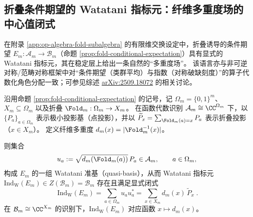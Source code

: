 \subsection{折叠条件期望的 Watatani 指标元：纤维多重度场的中心值闭式}\label{subsec:op-algebra-fold-watatani-index}
在附录 \ref{app:op-algebra-fold-subalgebra} 的有限维交换设定中，折叠诱导的条件期望 \(E_m:\mathcal{A}_m\to\mathcal{B}_m\)（命题 \ref{prop:fold-conditional-expectation}）具有显式的 Watatani 指标元，其在稳定层上给出一条自然的“多重度场”。
该语言亦与非可逆对称/范畴对称框架中对“条件期望（类群平均）与指数（对称破缺刻度）”的算子代数化角色分配一致；可参见综述 \href{https://arxiv.org/abs/2509.18072}{arXiv:2509.18072} 的相关讨论。

\begin{theorem}\label{thm:op-algebra-fold-watatani-index-equals-multiplicity-field}
沿用命题 \ref{prop:fold-conditional-expectation} 的记号，记 \(\Omega_m=\{0,1\}^m\)、\(X_m\subseteq\Omega_m\) 以及折叠 \(\Fold_m:\Omega_m\to X_m\)。
在函数代数识别
\(
\mathcal{A}_m\cong \CC^{\Omega_m}
\)
下，以 \(\{P_a\}_{a\in\Omega_m}\) 表示极小投影基（点投影），并以
\(
\widetilde P_x=\sum_{\Fold_m(a)=x}P_a
\)
表示折叠投影（\(x\in X_m\)）。
定义纤维多重度
\(
d_m(x)=|\Fold_m^{-1}(x)|
\)。

则集合
\[
u_a:=\sqrt{d_m(\Fold_m(a))}\,P_a\in\mathcal{A}_m,\qquad a\in\Omega_m,
\]
构成 \(E_m\) 的一组 Watatani 准基（quasi-basis），从而 Watatani 指标元 \(\mathrm{Ind}_{\mathrm{W}}(E_m)\in Z(\mathcal{B}_m)=\mathcal{B}_m\) 存在且满足显式闭式
\begin{equation}\label{eq:op-algebra-fold-watatani-index-closed}
\boxed{\;
\mathrm{Ind}_{\mathrm{W}}(E_m)
=\sum_{a\in\Omega_m}u_a u_a^\ast
=\sum_{x\in X_m} d_m(x)\,\widetilde P_x\; }.
\end{equation}
在 \(\mathcal{B}_m\cong \CC^{X_m}\) 的识别下，\(\mathrm{Ind}_{\mathrm{W}}(E_m)\) 对应函数 \(x\mapsto d_m(x)\)。
\end{theorem}
